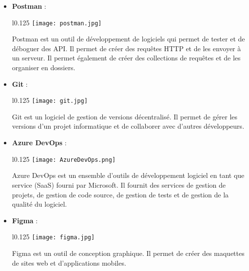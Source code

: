 \begin{itemize}
    \vspace{0.5cm}

    \item \textbf{Postman} :\\
    \begin{minipage}{\linewidth}
      \begin{wrapfigure}{l}{0.125\textwidth}
        \vspace{-0.5cm}
        \texttt{[image: postman.jpg]} 
      \end{wrapfigure}
      Postman est un outil de développement de logiciels qui permet de tester et de déboguer des API. Il permet de créer des requêtes HTTP et de les envoyer à un serveur. Il permet également de créer des collections de requêtes et de les organiser en dossiers.
    \end{minipage}

    \vspace{0.5cm}
    \item \textbf{Git} :\\
    \begin{minipage}{\linewidth}
      \begin{wrapfigure}{l}{0.125\textwidth}
        \vspace{-0.5cm}
        \texttt{[image: git.jpg]} 
      \end{wrapfigure}
      Git est un logiciel de gestion de versions décentralisé. Il permet de gérer les versions d'un projet informatique et de collaborer avec d'autres développeurs.
    \end{minipage}
    

    \vspace{0.5cm}
    \item \textbf{Azure DevOps} :\\
    \begin{minipage}{\linewidth}
      \begin{wrapfigure}{l}{0.125\textwidth}
        \vspace{-0.5cm}
        \texttt{[image: AzureDevOps.png]} 
      \end{wrapfigure}
      Azure DevOps est un ensemble d'outils de développement logiciel en tant que service (SaaS) fourni par Microsoft. Il fournit des services de gestion de projets, de gestion de code source, de gestion de tests et de gestion de la qualité du logiciel.
    \end{minipage}

    \vspace{0.5cm}
    \item \textbf{Figma} :\\
    \begin{minipage}{\linewidth}
      \begin{wrapfigure}{l}{0.125\textwidth}
        \vspace{-0.8cm}
        \texttt{[image: figma.jpg]} 
      \end{wrapfigure}
      Figma est un outil de conception graphique. Il permet de créer des maquettes de sites web et d'applications mobiles.
    \end{minipage}


\end{itemize}
